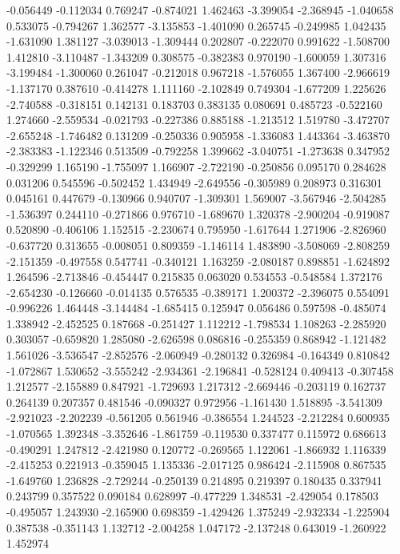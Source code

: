-0.056449
-0.112034
0.769247
-0.874021
1.462463
-3.399054
-2.368945
-1.040658
0.533075
-0.794267
1.362577
-3.135853
-1.401090
0.265745
-0.249985
1.042435
-1.631090
1.381127
-3.039013
-1.309444
0.202807
-0.222070
0.991622
-1.508700
1.412810
-3.110487
-1.343209
0.308575
-0.382383
0.970190
-1.600059
1.307316
-3.199484
-1.300060
0.261047
-0.212018
0.967218
-1.576055
1.367400
-2.966619
-1.137170
0.387610
-0.414278
1.111160
-2.102849
0.749304
-1.677209
1.225626
-2.740588
-0.318151
0.142131
0.183703
0.383135
0.080691
0.485723
-0.522160
1.274660
-2.559534
-0.021793
-0.227386
0.885188
-1.213512
1.519780
-3.472707
-2.655248
-1.746482
0.131209
-0.250336
0.905958
-1.336083
1.443364
-3.463870
-2.383383
-1.122346
0.513509
-0.792258
1.399662
-3.040751
-1.273638
0.347952
-0.329299
1.165190
-1.755097
1.166907
-2.722190
-0.250856
0.095170
0.284628
0.031206
0.545596
-0.502452
1.434949
-2.649556
-0.305989
0.208973
0.316301
0.045161
0.447679
-0.130966
0.940707
-1.309301
1.569007
-3.567946
-2.504285
-1.536397
0.244110
-0.271866
0.976710
-1.689670
1.320378
-2.900204
-0.919087
0.520890
-0.406106
1.152515
-2.230674
0.795950
-1.617644
1.271906
-2.826960
-0.637720
0.313655
-0.008051
0.809359
-1.146114
1.483890
-3.508069
-2.808259
-2.151359
-0.497558
0.547741
-0.340121
1.163259
-2.080187
0.898851
-1.624892
1.264596
-2.713846
-0.454447
0.215835
0.063020
0.534553
-0.548584
1.372176
-2.654230
-0.126660
-0.014135
0.576535
-0.389171
1.200372
-2.396075
0.554091
-0.996226
1.464448
-3.144484
-1.685415
0.125947
0.056486
0.597598
-0.485074
1.338942
-2.452525
0.187668
-0.251427
1.112212
-1.798534
1.108263
-2.285920
0.303057
-0.659820
1.285080
-2.626598
0.086816
-0.255359
0.868942
-1.121482
1.561026
-3.536547
-2.852576
-2.060949
-0.280132
0.326984
-0.164349
0.810842
-1.072867
1.530652
-3.555242
-2.934361
-2.196841
-0.528124
0.409413
-0.307458
1.212577
-2.155889
0.847921
-1.729693
1.217312
-2.669446
-0.203119
0.162737
0.264139
0.207357
0.481546
-0.090327
0.972956
-1.161430
1.518895
-3.541309
-2.921023
-2.202239
-0.561205
0.561946
-0.386554
1.244523
-2.212284
0.600935
-1.070565
1.392348
-3.352646
-1.861759
-0.119530
0.337477
0.115972
0.686613
-0.490291
1.247812
-2.421980
0.120772
-0.269565
1.122061
-1.866932
1.116339
-2.415253
0.221913
-0.359045
1.135336
-2.017125
0.986424
-2.115908
0.867535
-1.649760
1.236828
-2.729244
-0.250139
0.214895
0.219397
0.180435
0.337941
0.243799
0.357522
0.090184
0.628997
-0.477229
1.348531
-2.429054
0.178503
-0.495057
1.243930
-2.165900
0.698359
-1.429426
1.375249
-2.932334
-1.225904
0.387538
-0.351143
1.132712
-2.004258
1.047172
-2.137248
0.643019
-1.260922
1.452974
